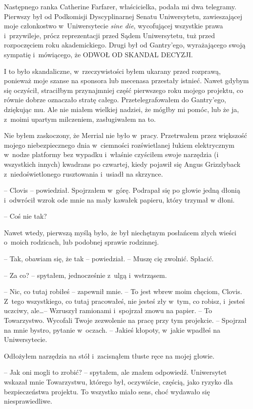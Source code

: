 \documentclass[oneside,polish,11pt,sfheadings]{mwbk}
\let\footnote=\endnote
\begin{document}
Następnego ranka Catherine Farfarer, właścicielka, podała mi dwa
telegramy. Pierwszy był od Podkomisji Dyscyplinarnej Senatu
Uniwersytetu, zawieszającej moje członkostwo w~Uniwersytecie \textit{sine
die}\footnote{ łac. na czas nieokreślony -- przyp.tłum.}, wycofującej
wszystkie prawa i~przywileje, prócz reprezentacji przed Sądem
Uniwersytetu, tuż przed rozpoczęciem roku akademickiego. Drugi był od
Gantry'ego, wyrażającego swoją sympatię i~mówiącego, że ODWOŁ OD SKANDAL
DECYZJI.

I to było skandaliczne, w~rzeczywistości byłem ukarany przed rozprawą,
ponieważ moje szanse na sponsora lub mecenasa przestały istnieć. Nawet
gdybym się oczyścił, straciłbym przynajmniej część pierwszego roku
mojego projektu, co równie dobrze oznaczało stratę całego.
Przetelegrafowałem do Gantry'ego, dziękując mu. Ale nie miałem wielkiej
nadziei, że mógłby mi pomóc, lub że ja, z~moimi upartym milczeniem,
zasługiwałem na to.

Nie byłem zaskoczony, że Merrial nie było w~pracy. Przetrwałem przez
większość mojego niebezpiecznego dnia w~ciemności rozświetlanej łukiem
elektrycznym w~nodze platformy bez wypadku i~właśnie czyściłem swoje
narzędzia (i wszystkich innych) kwadrans po czwartej, kiedy pojawił się
Angus Grizzlyback z~niedoświetlonego rusztowania i~usiadł na skrzynce.

-- Clovis -- powiedział. Spojrzałem w~górę. Podrapał się po głowie jedną
dłonią i~odwrócił wzrok ode mnie na mały kawałek papieru, który trzymał
w dłoni.

-- Coś nie tak?

Nawet wtedy, pierwszą myślą było, że był niechętnym posłańcem złych
wieści o~moich rodzicach, lub podobnej sprawie rodzinnej.

-- Tak, obawiam się, że tak -- powiedział. -- Muszę cię zwolnić. Spłacić.

-- Za co? -- spytałem, jednocześnie z~ulgą i~wstrząsem.

-- Nic, co tutaj robiłeś -- zapewnił mnie. -- To jest wbrew moim chęciom,
Clovis. Z~tego wszystkiego, co tutaj pracowałeś, nie jesteś zły w~tym,
co robisz, i~jesteś uczciwy, ale\ldots -- Wzruszył ramionami i~spojrzał
znowu na papier. -- To Towarzystwo. Wycofali Twoje zezwolenie na pracę
przy tym projekcie. -- Spojrzał na mnie bystro, pytanie w~oczach. -- Jakieś kłopoty, w~jakie wpadłeś na Uniwersytecie.

Odłożyłem narzędzia na stół i~zacisnąłem tłuste ręce na mojej głowie. 

-- Jak oni mogli to zrobić? -- spytałem, ale znałem odpowiedź. Uniwersytet
wskazał mnie Towarzystwu, którego był, oczywiście, częścią, jako
ryzyko dla bezpieczeństwa projektu. To wszystko miało sens, choć
wydawało się niesprawiedliwe.
\end{document}
